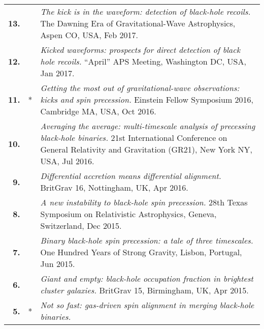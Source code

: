 {\begin{longtable}{rp{0.3cm}p{15.8cm}}
%
\textbf{13.} &  & \textit{The kick is in the waveform: detection of black-hole recoils.}
\newline{}
The Dawning Era of Gravitational-Wave Astrophysics, Aspen CO, USA, Feb 2017.
\vspace{0.05cm}\\
%
\textbf{12.} &  & \textit{Kicked waveforms: prospects for direct detection of black hole recoils.}
\newline{}
``April'' APS Meeting, Washington DC, USA, Jan 2017.
\vspace{0.05cm}\\
%
\textbf{11.} & * & \textit{Getting the most out of gravitational-wave observations: kicks and spin precession.}
\newline{}
Einstein Fellow Symposium 2016, Cambridge MA, USA, Oct 2016.
\vspace{0.05cm}\\
%
\textbf{10.} &  & \textit{Averaging the average: multi-timescale analysis of precessing black-hole binaries.}
\newline{}
21st International Conference on General Relativity and Gravitation (GR21), New York NY, USA, Jul 2016.
\vspace{0.05cm}\\
%
\textbf{9.} &  & \textit{Differential accretion means differential alignment.}
\newline{}
BritGrav 16, Nottingham, UK, Apr 2016.
\vspace{0.05cm}\\
%
\textbf{8.} &  & \textit{A new instability to black-hole spin precession.}
\newline{}
28th Texas Symposium on Relativistic Astrophysics, Geneva, Switzerland, Dec 2015.
\vspace{0.05cm}\\
%
\textbf{7.} &  & \textit{Binary black-hole spin precession: a tale of three timescales.}
\newline{}
One Hundred Years of Strong Gravity, Lisbon, Portugal, Jun 2015.
\vspace{0.05cm}\\
%
\textbf{6.} &  & \textit{Giant and empty: black-hole occupation fraction in brightest cluster galaxies.}
\newline{}
BritGrav 15, Birmingham, UK, Apr 2015.
\vspace{0.05cm}\\
%
\textbf{5.} & * & \textit{Not so fast: gas-driven spin alignment in merging black-hole binaries.}
\newline{}

\end{longtable}}
